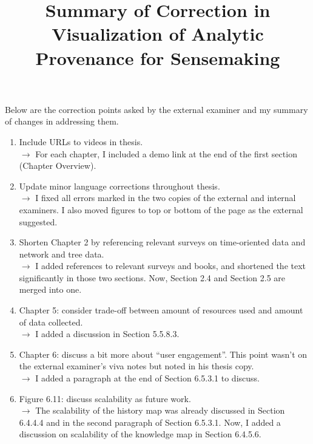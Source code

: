 \documentclass[12pt]{article}
\title{Summary of Correction in \\\textbf{Visualization of Analytic Provenance for Sensemaking}}
\date{}
\begin{document}
\maketitle

Below are the correction points asked by the external examiner and my summary of changes in addressing them.

\begin{enumerate}
	\item Include URLs to videos in thesis.
	\\ $\rightarrow$ For each chapter, I included a demo link at the end of the first section (Chapter Overview).
	
	\item Update minor language corrections throughout thesis.
	\\ $\rightarrow$ I fixed all errors marked in the two copies of the external and internal examiners. I also moved figures to top or bottom of the page as the external suggested.
	
	\item Shorten Chapter 2 by referencing relevant surveys on time-oriented data and network and tree data.
	\\ $\rightarrow$ I added references to relevant surveys and books, and shortened the text significantly in those two sections. Now, Section 2.4 and Section 2.5 are merged into one.
	
	\item Chapter 5: consider trade-off between amount of resources used and amount of data collected.
	\\ $\rightarrow$ I added a discussion in Section 5.5.8.3.
	
	\item Chapter 6: discuss a bit more about ``user engagement''. This point wasn't on the external examiner's viva notes but noted in his thesis copy.
	\\ $\rightarrow$ I added a paragraph at the end of Section 6.5.3.1 to discuss.
	
	\item Figure 6.11: discuss scalability as future work.
	\\ $\rightarrow$ The scalability of the history map was already discussed in Section 6.4.4.4 and in the second paragraph of Section 6.5.3.1. Now, I added a discussion on scalability of the knowledge map in Section 6.4.5.6.
\end{enumerate}
\end{document}
